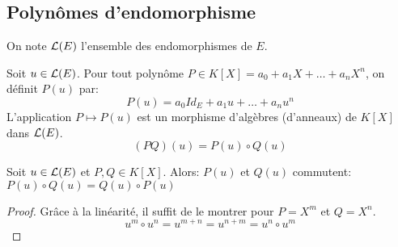 \subsection{Polynômes d'endomorphisme}
On note $\mathcal{L}(E)$ l'ensemble des endomorphismes de $E$.

\begin{definition}
	Soit $u \in \mathcal{L}(E)$. Pour tout polynôme $P \in K[X] = a_0 + a_1X + \ldots + a_nX^n$, on définit $P(u)$ par:
	$$P(u) = a_0 Id_E + a_1 u + \ldots + a_n u^n$$
	L'application $P \mapsto P(u)$ est un morphisme d'algèbres (d'anneaux) de $K[X]$ dans $\mathcal{L}(E)$.
	$$(PQ)(u) = P(u)\circ Q(u)$$
\end{definition}

\begin{prop}
	Soit $u \in \mathcal{L}(E)$ et $P, Q \in K[X]$. Alors:
	$P(u)$ et $Q(u)$ commutent: $P(u)\circ Q(u) = Q(u)\circ P(u)$
\end{prop}

\begin{proof}
	Grâce à la linéarité, il suffit de le montrer pour $P = X^m$ et $Q = X^n$.
	$$u^m\circ u^n = u^{m+n} = u^{n+m} = u^n\circ u^m$$
\end{proof}
